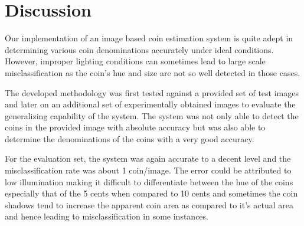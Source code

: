 \documentclass[report.tex]{subfile}
\begin{document}
\section{Discussion}

Our implementation of an image based coin estimation system is quite adept in
determining various coin denominations accurately under ideal conditions.
However, improper lighting conditions can sometimes lead to large scale
misclassification as the coin's hue and size are not so well detected in those
cases.

The developed methodology was first tested against a provided set of test
images and later on an additional set of experimentally obtained images to
evaluate the generalizing capability of the system. The system was not only
able to detect the coins in the provided image with absolute accuracy but was
also able to determine the denominations of the coins with a very good
accuracy.

For the evaluation set, the system was again accurate to a decent level and the
misclassification rate was about 1 coin/image. The error could be attributed to
low illumination making it difficult to differentiate between the hue of the
coins especially that of the 5 cents when compared to 10 cents and sometimes
the coin shadows tend to increase the apparent coin area as compared to it's
actual area and hence leading to misclassification in some instances.
\end{document}
